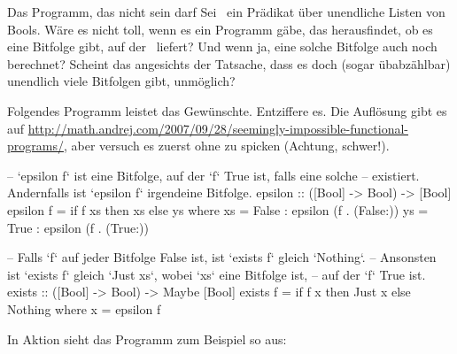 \documentclass{uebblatt}
\begin{document}
\begin{aufgabe}{Das Programm, das nicht sein darf}
Sei~ ein Prädikat über unendliche Listen
von Bools. Wäre es nicht toll, wenn es ein Programm gäbe, das herausfindet,
ob es eine Bitfolge gibt, auf der~ 
liefert? Und wenn ja, eine solche Bitfolge auch noch berechnet? Scheint das
angesichts der Tatsache, dass es doch (sogar übabzählbar) unendlich viele
Bitfolgen gibt, unmöglich?

Folgendes Programm leistet das Gewünschte. Entziffere es. Die Auflösung gibt es
auf
\url{http://math.andrej.com/2007/09/28/seemingly-impossible-functional-programs/},
aber versuch es zuerst ohne zu spicken (Achtung, schwer!).

\begin{haskellcode}
-- `epsilon f` ist eine Bitfolge, auf der `f` True ist, falls eine solche
-- existiert. Andernfalls ist `epsilon f` irgendeine Bitfolge.
epsilon :: ([Bool] -> Bool) -> [Bool]
epsilon f = if f xs then xs else ys
    where
    xs = False : epsilon (f . (False:))
    ys = True  : epsilon (f . (True:))

-- Falls `f` auf jeder Bitfolge False ist, ist `exists f` gleich `Nothing`.
-- Ansonsten ist `exists f` gleich `Just xs`, wobei `xs` eine Bitfolge ist,
-- auf der `f` True ist.
exists :: ([Bool] -> Bool) -> Maybe [Bool]
exists f = if f x then Just x else Nothing
    where x = epsilon f
\end{haskellcode}

In Aktion sieht das Programm zum Beispiel so aus:
\end{aufgabe}
\end{document}
